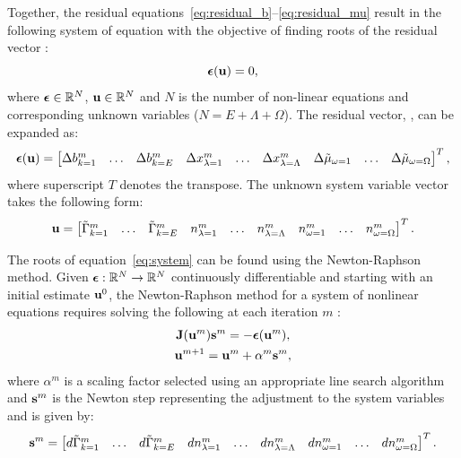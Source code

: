 Together, the residual equations~\eqref{eq:residual_b}--\eqref{eq:residual_mu} result in the following system of equation with the objective of finding roots \Unknown{} of the residual vector \Residual{}:
    \begin{equation}\label{eq:system}
        \boldsymbol{\epsilon} (\mathbf{u}) = 0,
    \end{equation}
where $\boldsymbol{\epsilon} \in \mathbb{R}^N$, $\mathbf{u} \in \mathbb{R}^N$ and $N$ is the number of non-linear equations and corresponding unknown variables ($N = E + \Lambda + \Omega$). The residual vector, \Residual, can be expanded as:
\begin{equation}\label{eq:resvec}
    \boldsymbol{\epsilon}(\mathbf{u}) = \begin{bmatrix}
                                \Delta b_{k=1}^m & \dots & \Delta b_{k=E}^m & \Delta x_{\lambda=1}^m & \dots & \Delta x_{\lambda=\Lambda}^m &  \Delta\tilde{\mu}_{\omega=1} & \dots & \Delta\tilde{\mu}_{\omega=\Omega}
                          \end{bmatrix}^T,
\end{equation}
where superscript $T$ denotes the transpose. The unknown system variable vector takes the following form:
\begin{equation}\label{eq:unknwnvec}
    \mathbf{u} = \begin{bmatrix}
                    \tilde{\Gamma}_{k=1}^m & \dots & \tilde{\Gamma}_{k=E}^m & n_{\lambda=1}^m & \dots &  n_{\lambda=\Lambda}^m & n_{\omega=1}^m & \dots &  n_{\omega=\Omega}^m
                \end{bmatrix}^T.
\end{equation}

The roots of equation~\eqref{eq:system} can be found using the Newton-Raphson method. Given $\boldsymbol{\epsilon}:\mathbb{R}^N \rightarrow \mathbb{R}^N$ continuously differentiable and starting with an initial estimate $\mathbf{u}^0$, the Newton-Raphson method for a system of nonlinear equations requires solving the following at each iteration $m$ \cite{Dennis:1996aa}:
\begin{gather}
    \mathbf{J}(\mathbf{u}^m) \mathbf{s}^m = -\boldsymbol{\epsilon}(\mathbf{u}^m),\\
    \mathbf{u}^{m+1} = \mathbf{u}^m + \alpha^m \mathbf{s}^{m},
\end{gather}
where $\alpha^m$ is a scaling factor selected using an appropriate line search algorithm and $\mathbf{s}^m$ is the Newton step representing the adjustment to the system variables and is given by:
\begin{equation}
    \mathbf{s}^{m} = \begin{bmatrix}
                    d\tilde{\Gamma}_{k=1}^m & \dots & d\tilde{\Gamma}_{k=E}^m & d n_{\lambda=1}^m & \dots & d n_{\lambda=\Lambda}^m & d n_{\omega=1}^m & \dots &  d n_{\omega=\Omega}^m
                \end{bmatrix}^T.
\end{equation}


